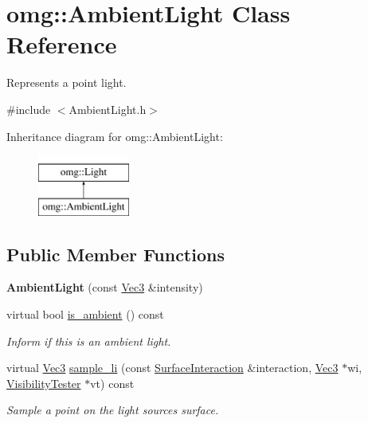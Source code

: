 \hypertarget{classomg_1_1_ambient_light}{}\section{omg\+::Ambient\+Light Class Reference}
\label{classomg_1_1_ambient_light}


Represents a point light.  




{\ttfamily \#include $<$Ambient\+Light.\+h$>$}

Inheritance diagram for omg\+::Ambient\+Light\+:\begin{figure}[H]
\begin{center}
\leavevmode
\includegraphics[height=2.000000cm]{classomg_1_1_ambient_light}
\end{center}
\end{figure}
\subsection*{Public Member Functions}
\begin{DoxyCompactItemize}
\item 
\mbox{\label{classomg_1_1_ambient_light_a6b642bdf031a92d0f7deea16cb4b4d92}} 
{\bfseries Ambient\+Light} (const \mbox{\hyperlink{namespaceomg_a45a9482677fee9933ff369b49894e316}{Vec3}} \&intensity)
\item 
virtual bool \mbox{\hyperlink{classomg_1_1_ambient_light_a97dcae69b5ef72ca8845e03a4c3185e4}{is\+\_\+ambient}} () const
\begin{DoxyCompactList}\small\item\em Inform if this is an ambient light. \end{DoxyCompactList}\item 
\mbox{\label{classomg_1_1_ambient_light_a83502a1ccd9b77845d26906e6eea94e6}} 
virtual \mbox{\hyperlink{namespaceomg_a45a9482677fee9933ff369b49894e316}{Vec3}} \mbox{\hyperlink{classomg_1_1_ambient_light_a83502a1ccd9b77845d26906e6eea94e6}{sample\+\_\+li}} (const \mbox{\hyperlink{classomg_1_1_surface_interaction}{Surface\+Interaction}} \&interaction, \mbox{\hyperlink{namespaceomg_a45a9482677fee9933ff369b49894e316}{Vec3}} $\ast$wi, \mbox{\hyperlink{classomg_1_1_visibility_tester}{Visibility\+Tester}} $\ast$vt) const
\begin{DoxyCompactList}\small\item\em Sample a point on the light source\textquotesingle{}s surface. \end{DoxyCompactList}\end{DoxyCompactItemize}
